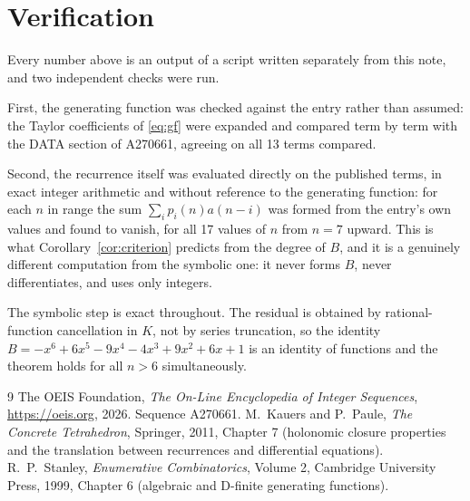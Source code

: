 \documentclass[11pt,a4paper]{article}
\theoremstyle{plain}
\theoremstyle{definition}
\begin{document}
\section{Verification}

Every number above is an output of a script written separately from this note, and two
independent checks were run.

First, the generating function was checked against the entry rather than assumed: the
Taylor coefficients of \eqref{eq:gf} were expanded and compared term by term with the DATA
section of A270661, agreeing on all 13 terms compared.

Second, the recurrence itself was evaluated directly on the published terms, in exact
integer arithmetic and without reference to the generating function: for each $n$ in range
the sum $\sum_{i}p_{i}(n)a(n-i)$ was formed from the entry's own values and found to
vanish, for all 17 values of $n$ from $n=7$ upward. This is what
Corollary~\ref{cor:criterion} predicts from the degree of $B$, and it is a genuinely
different computation from the symbolic one: it never forms $B$, never differentiates, and
uses only integers.

The symbolic step is exact throughout. The residual is obtained by rational-function
cancellation in $K$, not by series truncation, so the identity $B=- x^{6} + 6 x^{5} - 9 x^{4} - 4 x^{3} + 9 x^{2} + 6 x + 1$ is an
identity of functions and the theorem holds for all $n>6$ simultaneously.

\begin{thebibliography}{9}
 The OEIS Foundation, \emph{The On-Line Encyclopedia of Integer Sequences},
\url{https://oeis.org}, 2026. Sequence A270661.
 M.~Kauers and P.~Paule, \emph{The Concrete Tetrahedron}, Springer, 2011,
Chapter 7 (holonomic closure properties and the translation between recurrences and
differential equations).
 R.~P.~Stanley, \emph{Enumerative Combinatorics}, Volume 2, Cambridge
University Press, 1999, Chapter 6 (algebraic and D-finite generating functions).
\end{thebibliography}
\end{document}
